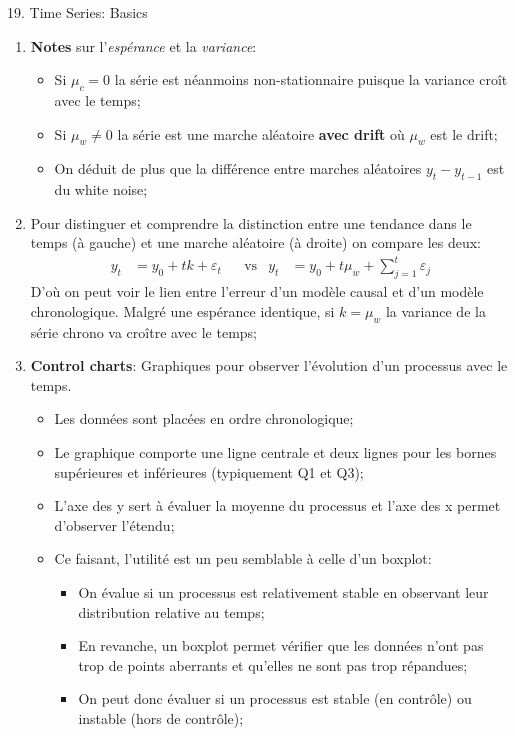 \documentclass[12pt, titlepage, french]{report}
\begin{document}
\begin{CHPT_SUMM}[label = {timeseries19}]{19. Time Series: Basics}
\begin{enumerate}
	\item[]	\textbf{Notes} sur l'\textit{espérance} et la \textit{variance}:
		\begin{itemize}
		\item	Si $\mu_{c} = 0$ la série est néanmoins non-stationnaire puisque la variance croît avec le temps;
		\item	Si $\mu_{w} \neq 0$ la série est une marche aléatoire \textbf{avec drift} où $\mu_{w}$ est le drift;
		\item	On déduit de plus que la différence entre marches aléatoires $y_{t} - y_{t - 1}$ est du white noise;
		\end{itemize}
	\item[]	Pour distinguer et comprendre la distinction entre une tendance dans le temps (à gauche) et une marche aléatoire (à droite) on compare les deux:
	\begin{align*}
		y_{t}	&= 	y_{0} + t k + \varepsilon_{t}	&
		&\text{vs}	&
		y_{t}	&= 	y_{0} + t \mu_{w}  + \sum_{j = 1}^{t} \varepsilon_{j}	
	\end{align*}
	D'où on peut voir le lien entre l'erreur d'un modèle causal et d'un modèle chronologique. Malgré une espérance identique, si $k = \mu_{w}$ la variance de la série chrono va croître avec le temps;
	\item	\textbf{Control charts}: Graphiques pour observer l'évolution d'un processus avec le temps.
		\begin{itemize}
		\item	Les données sont placées en ordre chronologique;
		\item	Le graphique comporte une ligne centrale et deux lignes pour les bornes supérieures et inférieures (typiquement Q1 et Q3);
		\item	L'axe des y sert à évaluer la moyenne du processus et l'axe des x permet d'observer l'étendu;
		\item	Ce faisant, l'utilité est un peu semblable à celle d'un boxplot:
			\begin{itemize}
			\item	On évalue si un processus est relativement stable en observant leur distribution relative au temps;
			\item	En revanche, un boxplot permet vérifier que les données n'ont pas trop de points aberrants et qu’elles ne sont pas trop répandues;
			\item	On peut donc évaluer si un processus est stable (en contrôle) ou instable (hors de contrôle);
			\end{itemize}

\end{itemize}
\end{enumerate}
\end{CHPT_SUMM}
\end{document}
